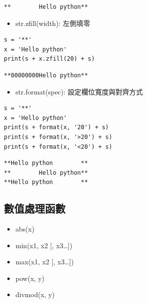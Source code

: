 \documentclass[a4paper,12pt]{article}
\begin{document}
\begin{enumerate}
\begin{verbatim}
**        Hello python**
\end{verbatim}


\begin{itemize}
\item str.zfill(width): 左側填零\\
\end{itemize}
\lstset{breaklines=true,language=Python,label= ,caption= ,captionpos=b,firstnumber=1,numbers=left}
\begin{lstlisting}
s = '**'
x = 'Hello python'
print(s + x.zfill(20) + s)
\end{lstlisting}

\begin{verbatim}
**00000000Hello python**
\end{verbatim}


\begin{itemize}
\item str.format(spec): 設定欄位寬度與對齊方式\\
\end{itemize}
\lstset{breaklines=true,language=Python,label= ,caption= ,captionpos=b,firstnumber=1,numbers=left}
\begin{lstlisting}
s = '**'
x = 'Hello python'
print(s + format(x, '20') + s)
print(s + format(x, '>20') + s)
print(s + format(x, '<20') + s)
\end{lstlisting}

\begin{verbatim}
**Hello python        **
**        Hello python**
**Hello python        **
\end{verbatim}
\end{enumerate}

\subsection{數值處理函數}
\label{sec:org73a694f}
\begin{itemize}
\item abs(x)\\
\item min(x1, x2 [, x3\ldots{}])\\
\item max(x1, x2 [, x3\ldots{}])\\
\item pow(x, y)\\
\item divmod(x, y)\\
\end{itemize}
\end{document}
